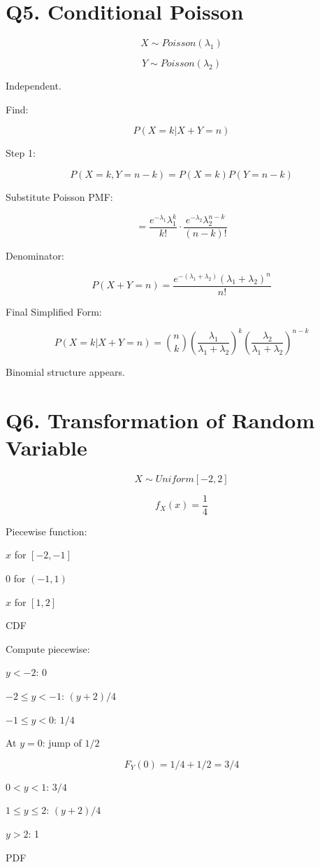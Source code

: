 \documentclass{article}
\begin{document}
\section*{Q5. Conditional Poisson}

\[
X \sim Poisson(\lambda_1)
\]

\[
Y \sim Poisson(\lambda_2)
\]

Independent.

Find:

\[
P(X=k|X+Y=n)
\]

Step 1:

\[
P(X=k, Y=n-k) = P(X=k)P(Y=n-k)
\]

Substitute Poisson PMF:

\[
= \frac{e^{-\lambda_1}\lambda_1^k}{k!}
\cdot
\frac{e^{-\lambda_2}\lambda_2^{n-k}}{(n-k)!}
\]

Denominator:

\[
P(X+Y=n)
=
\frac{e^{-(\lambda_1+\lambda_2)}(\lambda_1+\lambda_2)^n}{n!}
\]

Final Simplified Form:

\[
P(X=k|X+Y=n)
=
\binom{n}{k}
\left(\frac{\lambda_1}{\lambda_1+\lambda_2}\right)^k
\left(\frac{\lambda_2}{\lambda_1+\lambda_2}\right)^{n-k}
\]

Binomial structure appears.

\section*{Q6. Transformation of Random Variable}

\[
X \sim Uniform[-2,2]
\]

\[
f_X(x) = \frac{1}{4}
\]

Piecewise function:

$x$ for $[-2,-1]$

$0$ for $(-1,1)$

$x$ for $[1,2]$

CDF

Compute piecewise:

$y<-2$: 0

$-2 \le y < -1$: $(y+2)/4$

$-1 \le y < 0$: $1/4$

At $y=0$: jump of $1/2$

\[
F_Y(0) = 1/4 + 1/2 = 3/4
\]

$0<y<1$: $3/4$

$1 \le y \le 2$: $(y+2)/4$

$y>2$: 1

PDF
\end{document}
